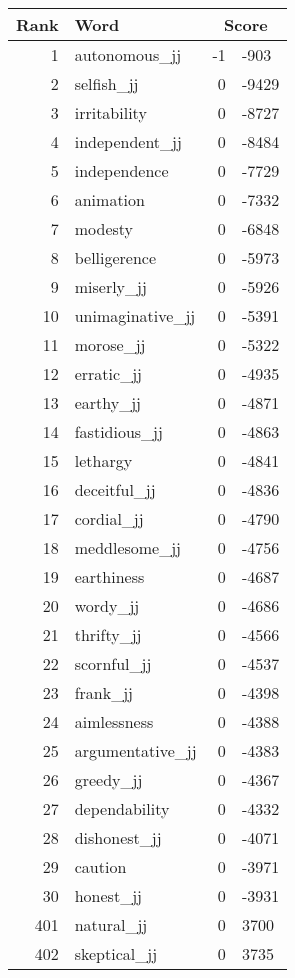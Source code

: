 \begin{longtable}[!htbp]{| rlr@{.}l |}
    \hline
    \textbf{Rank} & \textbf{Word} & \multicolumn{2}{c|}{\textbf{Score}} \\
    \hline
    \endhead
    1 & autonomous\_jj & -1 & -903 \\
    2 & selfish\_jj & 0 & -9429 \\
    3 & irritability & 0 & -8727 \\
    4 & independent\_jj & 0 & -8484 \\
    5 & independence & 0 & -7729 \\
    6 & animation & 0 & -7332 \\
    7 & modesty & 0 & -6848 \\
    8 & belligerence & 0 & -5973 \\
    9 & miserly\_jj & 0 & -5926 \\
    10 & unimaginative\_jj & 0 & -5391 \\
    11 & morose\_jj & 0 & -5322 \\
    12 & erratic\_jj & 0 & -4935 \\
    13 & earthy\_jj & 0 & -4871 \\
    14 & fastidious\_jj & 0 & -4863 \\
    15 & lethargy & 0 & -4841 \\
    16 & deceitful\_jj & 0 & -4836 \\
    17 & cordial\_jj & 0 & -4790 \\
    18 & meddlesome\_jj & 0 & -4756 \\
    19 & earthiness & 0 & -4687 \\
    20 & wordy\_jj & 0 & -4686 \\
    21 & thrifty\_jj & 0 & -4566 \\
    22 & scornful\_jj & 0 & -4537 \\
    23 & frank\_jj & 0 & -4398 \\
    24 & aimlessness & 0 & -4388 \\
    25 & argumentative\_jj & 0 & -4383 \\
    26 & greedy\_jj & 0 & -4367 \\
    27 & dependability & 0 & -4332 \\
    28 & dishonest\_jj & 0 & -4071 \\
    29 & caution & 0 & -3971 \\
    30 & honest\_jj & 0 & -3931 \\
    401 & natural\_jj & 0 & 3700 \\
    402 & skeptical\_jj & 0 & 3735 \\

\end{longtable}
